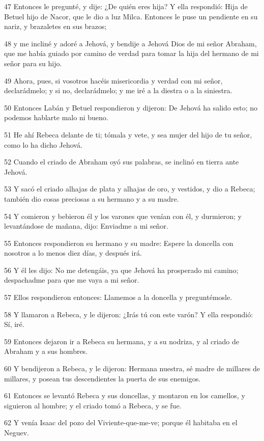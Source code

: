 \par 47 Entonces le pregunté, y dije: ¿De quién eres hija? Y ella respondió: Hija de Betuel hijo de Nacor, que le dio a luz Milca. Entonces le puse un pendiente en su nariz, y brazaletes en sus brazos;
\par 48 y me incliné y adoré a Jehová, y bendije a Jehová Dios de mi señor Abraham, que me había guiado por camino de verdad para tomar la hija del hermano de mi señor para su hijo.
\par 49 Ahora, pues, si vosotros hacéis misericordia y verdad con mi señor, declarádmelo; y si no, declarádmelo; y me iré a la diestra o a la siniestra.
\par 50 Entonces Labán y Betuel respondieron y dijeron: De Jehová ha salido esto; no podemos hablarte malo ni bueno.
\par 51 He ahí Rebeca delante de ti; tómala y vete, y sea mujer del hijo de tu señor, como lo ha dicho Jehová.
\par 52 Cuando el criado de Abraham oyó sus palabras, se inclinó en tierra ante Jehová.
\par 53 Y sacó el criado alhajas de plata y alhajas de oro, y vestidos, y dio a Rebeca; también dio cosas preciosas a su hermano y a su madre.
\par 54 Y comieron y bebieron él y los varones que venían con él, y durmieron; y levantándose de mañana, dijo: Enviadme a mi señor.
\par 55 Entonces respondieron su hermano y su madre: Espere la doncella con nosotros a lo menos diez días, y después irá.
\par 56 Y él les dijo: No me detengáis, ya que Jehová ha prosperado mi camino; despachadme para que me vaya a mi señor.
\par 57 Ellos respondieron entonces: Llamemos a la doncella y preguntémosle.
\par 58 Y llamaron a Rebeca, y le dijeron: ¿Irás tú con este varón? Y ella respondió: Sí, iré.
\par 59 Entonces dejaron ir a Rebeca su hermana, y a su nodriza, y al criado de Abraham y a sus hombres.
\par 60 Y bendijeron a Rebeca, y le dijeron: Hermana nuestra, sé madre de millares de millares, y posean tus descendientes la puerta de sus enemigos.
\par 61 Entonces se levantó Rebeca y sus doncellas, y montaron en los camellos, y siguieron al hombre; y el criado tomó a Rebeca, y se fue.
\par 62 Y venía Isaac del pozo del Viviente-que-me-ve; porque él habitaba en el Neguev.

